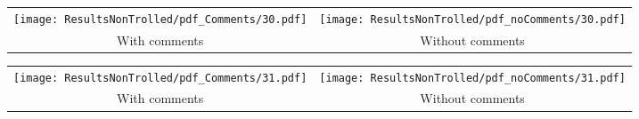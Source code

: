 \begin{tabular}{cc}
{  \texttt{[image: ResultsNonTrolled/pdf\_Comments/30.pdf]} } & 
{  \texttt{[image: ResultsNonTrolled/pdf\_noComments/30.pdf]}} \\
 With comments & Without comments \\
\end{tabular}

\begin{tabular}{cc}
{  \texttt{[image: ResultsNonTrolled/pdf\_Comments/31.pdf]} } & 
{  \texttt{[image: ResultsNonTrolled/pdf\_noComments/31.pdf]}} \\
 With comments & Without comments \\
\end{tabular}

